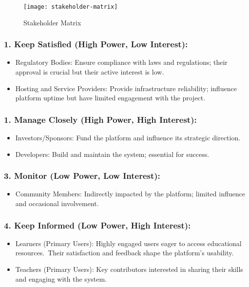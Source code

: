 \begin{figure}[h]
    \centering
    \texttt{[image: stakeholder-matrix]}
    \caption{Stakeholder Matrix}
    \label{fig:figure0}
\end{figure}

\subsubsection*{1. Keep Satisfied (High Power, Low Interest):}
\begin{itemize}
\item Regulatory Bodies: Ensure compliance with laws and regulations; their approval is crucial but their active interest is low.
\item Hosting and Service Providers: Provide infrastructure reliability; influence platform uptime but have limited engagement with the project.
\end{itemize}

\subsubsection*{1. Manage Closely (High Power, High Interest):}
\begin{itemize}
\item Investors/Sponsors: Fund the platform and influence its strategic direction.
\item Developers: Build and maintain the system; essential for success.
\end{itemize}

\subsubsection*{3. Monitor (Low Power, Low Interest):}
\begin{itemize}
\item Community Members: Indirectly impacted by the platform; limited influence and occasional involvement.
\end{itemize}

\subsubsection*{4. Keep Informed (Low Power, High Interest):}
\begin{itemize}
\item Learners (Primary Users): Highly engaged users eager to access educational resources.\ Their satisfaction and feedback shape the platform’s usability.
\item Teachers (Primary Users): Key contributors interested in sharing their skills and engaging with the system.
\end{itemize}

